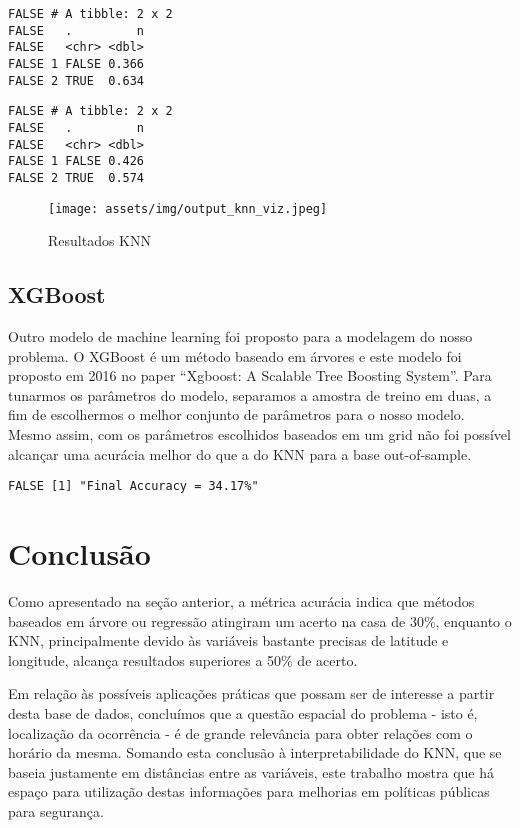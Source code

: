 \documentclass[
  12pt,
  portuguese,
]{report}
\begin{document}
\begin{verbatim}
FALSE # A tibble: 2 x 2
FALSE   .         n
FALSE   <chr> <dbl>
FALSE 1 FALSE 0.366
FALSE 2 TRUE  0.634
\end{verbatim}

\begin{verbatim}
FALSE # A tibble: 2 x 2
FALSE   .         n
FALSE   <chr> <dbl>
FALSE 1 FALSE 0.426
FALSE 2 TRUE  0.574
\end{verbatim}

\begin{figure}
\centering
\texttt{[image: assets/img/output\_knn\_viz.jpeg]}
\caption{Resultados KNN}
\end{figure}

\hypertarget{xgboost-1}{%
\section{XGBoost}\label{xgboost-1}}

Outro modelo de machine learning foi proposto para a modelagem do nosso problema. O XGBoost é um método baseado em árvores e este modelo foi proposto em 2016 no paper ``Xgboost: A Scalable Tree Boosting System''. Para tunarmos os parâmetros do modelo, separamos a amostra de treino em duas, a fim de escolhermos o melhor conjunto de parâmetros para o nosso modelo. Mesmo assim, com os parâmetros escolhidos baseados em um grid não foi possível alcançar uma acurácia melhor do que a do KNN para a base out-of-sample.

\begin{verbatim}
FALSE [1] "Final Accuracy = 34.17%"
\end{verbatim}

\hypertarget{conclusao}{%
\chapter{Conclusão}\label{conclusao}}

Como apresentado na seção anterior, a métrica acurácia indica que métodos baseados em árvore ou regressão atingiram um acerto na casa de 30\%, enquanto o KNN, principalmente devido às variáveis bastante precisas de latitude e longitude, alcança resultados superiores a 50\% de acerto.

Em relação às possíveis aplicações práticas que possam ser de interesse a partir desta base de dados, concluímos que a questão espacial do problema - isto é, localização da ocorrência - é de grande relevância para obter relações com o horário da mesma. Somando esta conclusão à interpretabilidade do KNN, que se baseia justamente em distâncias entre as variáveis, este trabalho mostra que há espaço para utilização destas informações para melhorias em políticas públicas para segurança.
\end{document}
